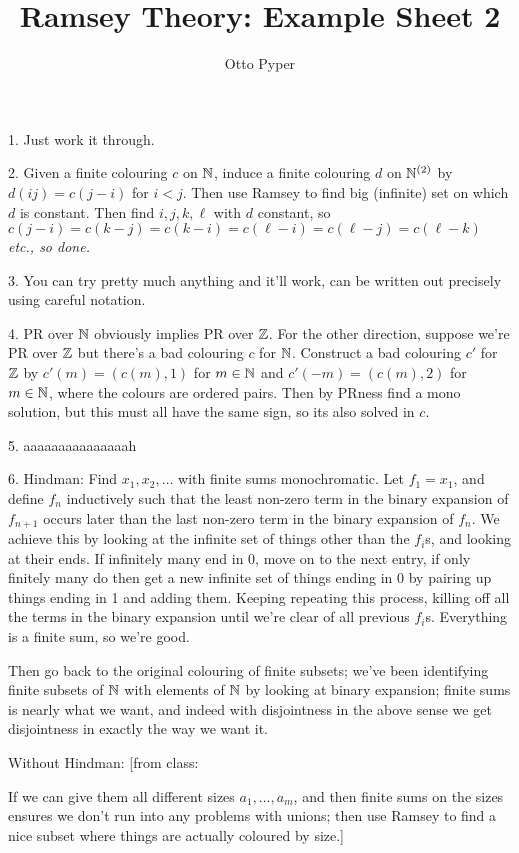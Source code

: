 \documentclass[10pt]{article}
\title{Ramsey Theory: Example Sheet 2}
\author{Otto Pyper}
\date{}
\begin{document}
\maketitle

1. Just work it through.

2. Given a finite colouring $c$ on $\mathbb{N}$, induce a finite colouring $d$ on $\mathbb{N}^{(2)}$ by $d(ij) = c(j-i)$ for $i < j$. Then use Ramsey to find big (infinite) set on which $d$ is constant. Then find $i,j,k,\ell$ with $d$ constant, so $c(j-i) = c(k-j) = c(k - i) = c(\ell - i) = c(\ell - j) = c(\ell - k)$ \it{etc.}, so done.

3. You can try pretty much anything and it'll work, can be written out precisely using careful notation.

4. PR over $\mathbb{N}$ obviously implies PR over $\mathbb{Z}$. For the other direction, suppose we're PR over $\mathbb{Z}$ but there's a bad colouring $c$ for $\mathbb{N}$. Construct a bad colouring $c'$ for $\mathbb{Z}$ by $c'(m) = (c(m),1)$ for $m \in \mathbb{N}$ and $c'(-m) = (c(m),2)$ for $m \in \mathbb{N}$, where the colours are ordered pairs. Then by PRness find a mono solution, but this must all have the same sign, so its also solved in $c$.

5. aaaaaaaaaaaaaaah

6. Hindman: Find $x_1,x_2,\dots$ with finite sums monochromatic. Let $f_1 = x_1$, and define $f_n$ inductively such that the least non-zero term in the binary expansion of $f_{n+1}$ occurs later than the last non-zero term in the binary expansion of $f_n$. We achieve this by looking at the infinite set of things other than the $f_i$s, and looking at their ends. If infinitely many end in $0$, move on to the next entry, if only finitely many do then get a new infinite set of things ending in $0$ by pairing up things ending in 1 and adding them. Keeping repeating this process, killing off all the terms in the binary expansion until we're clear of all previous $f_i$s. Everything is a finite sum, so we're good.

Then go back to the original colouring of finite subsets; we've been identifying finite subsets of $\mathbb{N}$ with elements of $\mathbb{N}$ by looking at binary expansion; finite sums is nearly what we want, and indeed with disjointness in the above sense we get disjointness in exactly the way we want it.

Without Hindman: [from class:

If we can give them all different sizes $a_1,\dots,a_m$, and then finite sums on the sizes ensures we don't run into any problems with unions; then use Ramsey to find a nice subset where things are actually coloured by size.]
\end{document}
